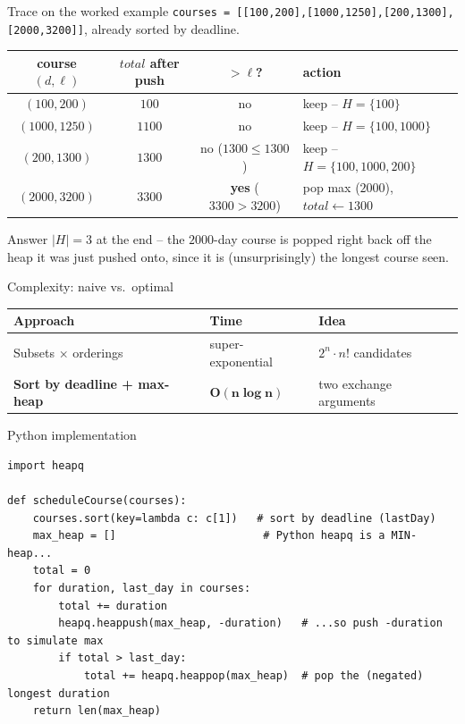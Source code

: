 \documentclass[11pt,aspectratio=169]{beamer}
\begin{document}
\begin{frame}{Trace on the worked example}
  \small
  \texttt{courses = [[100,200],[1000,1250],[200,1300],[2000,3200]]}, already sorted by
  deadline.
  \begin{center}
  \begin{tabular}{@{}cccl@{}}
    \toprule
    course $(d, \ell)$ & $total$ after push & $> \ell$? & action \\
    \midrule
    $(100, 200)$ & $100$ & no & keep -- $H=\{100\}$ \\
    $(1000, 1250)$ & $1100$ & no & keep -- $H=\{100,1000\}$ \\
    $(200, 1300)$ & $1300$ & no ($1300 \le 1300$) & keep -- $H=\{100,1000,200\}$ \\
    $(2000, 3200)$ & $3300$ & \textbf{yes} ($3300 > 3200$) & pop max ($2000$),
    $total \gets 1300$ \\
    \bottomrule
  \end{tabular}
  \end{center}
  \begin{exampleblock}{Answer}
    $|H| = 3$ at the end -- the $2000$-day course is popped right back off the heap
    it was just pushed onto, since it is (unsurprisingly) the longest course seen.
  \end{exampleblock}
\end{frame}

\begin{frame}{Complexity: naive vs.\ optimal}
  \small
  \begin{center}
  \begin{tabular}{@{}lll@{}}
    \toprule
    Approach & Time & Idea \\
    \midrule
    Subsets $\times$ orderings & super-exponential & $2^n \cdot n!$ candidates \\
    \textbf{Sort by deadline + max-heap} & $\boldsymbol{O(n \log n)}$ & two exchange
    arguments \\
    \bottomrule
  \end{tabular}
  \end{center}
\end{frame}

\begin{frame}[fragile]{Python implementation}
  \begin{lstlisting}[style=py]
import heapq

def scheduleCourse(courses):
    courses.sort(key=lambda c: c[1])   # sort by deadline (lastDay)
    max_heap = []                       # Python heapq is a MIN-heap...
    total = 0
    for duration, last_day in courses:
        total += duration
        heapq.heappush(max_heap, -duration)   # ...so push -duration to simulate max
        if total > last_day:
            total += heapq.heappop(max_heap)  # pop the (negated) longest duration
    return len(max_heap)
  \end{lstlisting}
\end{frame}
\end{document}
